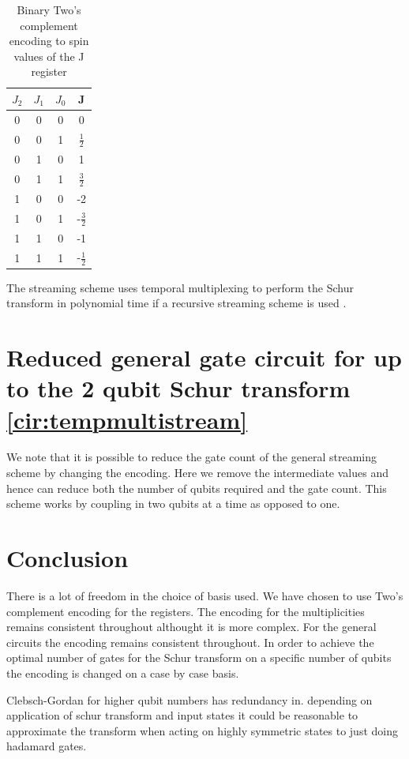 \documentclass[12pt]{article}
\begin{document}
\begin{table}
\begin{tabular}{ |c c c|c| }
\hline
 $J_2$ &$J_1$ &$J_0$ &J \\
 \hline
 0 &0 &0 &0 \\ 
 0 &0 &1 &$\frac{1}{2}$ \\ 
 0 &1 &0 &1 \\ 
 0 &1 &1 &$\frac{3}{2}$ \\ 
 \hline 
 1 &0 &0 &-2 \\ 
 1 &0 &1 &-$\frac{3}{2}$ \\ 
 1 &1 &0 &-1 \\ 
 1 &1 &1 &-$\frac{1}{2}$ \\  
 \hline 
\end{tabular}
\caption{Binary Two's complement encoding to spin values of the J register}
\label{tab:encoding}
\vspace{-110pt}
\end{table}

The streaming scheme uses temporal multiplexing to perform the Schur transform in polynomial time if a recursive streaming scheme is used \cite{bacon2007quantum}.


\section{Reduced general gate circuit for up to the 2 qubit Schur transform \autoref{cir:tempmultistream}}

We note that it is possible to reduce the gate count of the general streaming scheme by changing the encoding. Here we remove the intermediate values and hence can reduce both the number of qubits required and the gate count. This scheme works by coupling in two qubits at a time as opposed to one.


\section{Conclusion}

There is a lot of freedom in the choice of basis used. We have chosen to use Two's complement encoding for the registers. The encoding for the multiplicities remains consistent throughout althought it is more complex. For the general circuits the encoding remains consistent throughout. In order to achieve the optimal number of gates for the Schur transform on a specific number of qubits the encoding is changed on a case by case basis. 

Clebsch-Gordan for higher qubit numbers has redundancy in. depending on application of schur transform and input states it could be reasonable to approximate the transform when acting on highly symmetric states to just doing hadamard gates.





\newpage

\begin{landscape}

\end{landscape}

\end{document}
